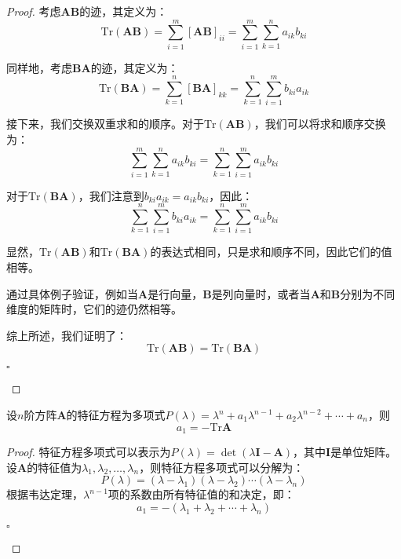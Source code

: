 \begin{proof}
	考虑$\mathbf{A}\mathbf{B}$的迹，其定义为：
$$
\text{Tr}(\mathbf{A}\mathbf{B}) = \sum_{i=1}^m [\mathbf{A}\mathbf{B}]_{ii} = \sum_{i=1}^m \sum_{k=1}^n a_{ik} b_{ki}
$$

同样地，考虑$\mathbf{B}\mathbf{A}$的迹，其定义为：
$$
\text{Tr}(\mathbf{B}\mathbf{A}) = \sum_{k=1}^n [\mathbf{B}\mathbf{A}]_{kk} = \sum_{k=1}^n \sum_{i=1}^m b_{ki} a_{ik}
$$

接下来，我们交换双重求和的顺序。对于$\text{Tr}(\mathbf{A}\mathbf{B})$，我们可以将求和顺序交换为：
$$
\sum_{i=1}^m \sum_{k=1}^n a_{ik} b_{ki} = \sum_{k=1}^n \sum_{i=1}^m a_{ik} b_{ki}
$$

对于$\text{Tr}(\mathbf{B}\mathbf{A})$，我们注意到$b_{ki} a_{ik} = a_{ik} b_{ki}$，因此：
$$
\sum_{k=1}^n \sum_{i=1}^m b_{ki} a_{ik} = \sum_{k=1}^n \sum_{i=1}^m a_{ik} b_{ki}
$$

显然，$\text{Tr}(\mathbf{A}\mathbf{B})$和$\text{Tr}(\mathbf{B}\mathbf{A})$的表达式相同，只是求和顺序不同，因此它们的值相等。

通过具体例子验证，例如当$\mathbf{A}$是行向量，$\mathbf{B}$是列向量时，或者当$\mathbf{A}$和$\mathbf{B}$分别为不同维度的矩阵时，它们的迹仍然相等。

综上所述，我们证明了：
$$
\text{Tr}(\mathbf{A}\mathbf{B}) = \text{Tr}(\mathbf{B}\mathbf{A})
$$
\begin{flushright}
		$\square$
	\end{flushright}
\end{proof}

\begin{corollary}
	\label{cor:trace}
	设$n$阶方阵$\mathbf{A}$的特征方程为多项式$P(\lambda)=\lambda^n+a_1\lambda^{n-1}+a_2\lambda^{n-2}+\cdots+a_n$，则$$a_1=-\text{Tr}\mathbf{A}$$
\end{corollary}

\begin{proof}
	特征方程多项式可以表示为$P(\lambda) = \det(\lambda \mathbf{I} - \mathbf{A})$，其中$\mathbf{I}$是单位矩阵。设$\mathbf{A}$的特征值为$\lambda_1, \lambda_2, \ldots, \lambda_n$，则特征方程多项式可以分解为：
   $$
   P(\lambda) = (\lambda - \lambda_1)(\lambda - \lambda_2) \cdots (\lambda - \lambda_n)
   $$
   根据韦达定理，$\lambda^{n-1}$项的系数由所有特征值的和决定，即：
   $$
   a_1 = -(\lambda_1 + \lambda_2 + \cdots + \lambda_n)
   $$
   \begin{flushright}
		$\square$
	\end{flushright}
\end{proof}


